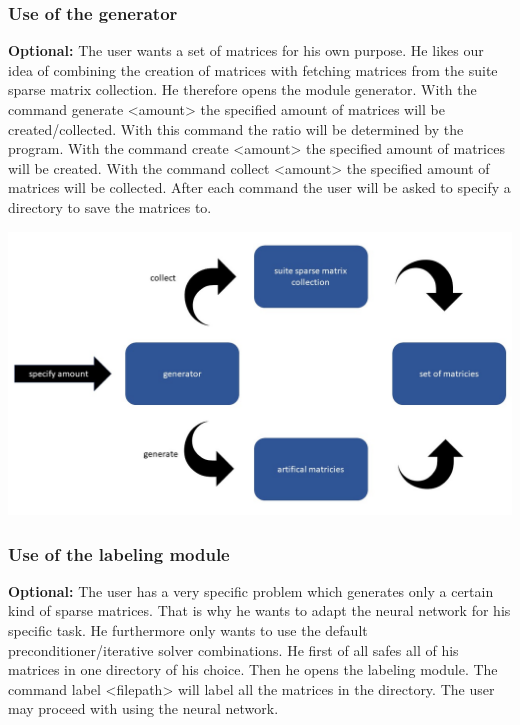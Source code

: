\documentclass[parskip=full]{scrartcl}
\begin{document}
\subsubsection{Use of the generator}
\textbf{Optional:} The user wants a set of matrices for his own purpose. He likes our idea of combining the creation of matrices with fetching matrices from the suite sparse matrix collection. He therefore opens the module generator. With the command generate <amount> the specified amount of matrices will be created/collected. With this command the ratio will be determined by the program. With the command create <amount> the specified amount of matrices will be created.  With the command collect <amount> the specified amount of matrices will be collected. After each command the user will be asked to specify a directory to save the matrices to.
\begin{center}
\includegraphics[width=\textwidth]{generator}
\end{center}

\subsubsection{Use of the labeling module}
\textbf{Optional:} The user has a very specific problem which generates only a certain kind of sparse matrices. That is why he wants to adapt the neural network for his specific task. He furthermore only wants to use the default preconditioner/iterative solver combinations. He first of all safes all of his matrices in one directory of his choice. Then he opens the labeling module. The command label <filepath> will label all the matrices in the directory. The user may proceed with using the neural network.
\end{document}
